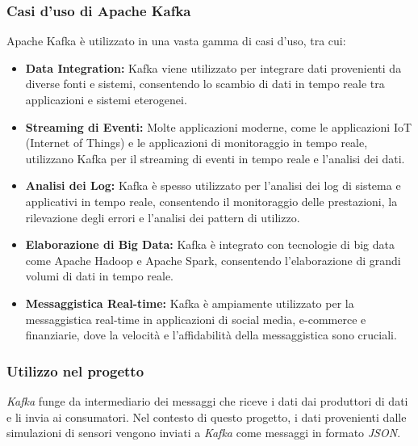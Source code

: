 \subsubsection{Casi d'uso di Apache Kafka}

Apache Kafka è utilizzato in una vasta gamma di casi d'uso, tra cui:

\begin{itemize}
  \item \textbf{Data Integration:} Kafka viene utilizzato per integrare dati provenienti da diverse fonti e sistemi, consentendo lo scambio di dati in tempo reale tra applicazioni e sistemi eterogenei.
  
  \item \textbf{Streaming di Eventi:} Molte applicazioni moderne, come le applicazioni IoT (Internet of Things) e le applicazioni di monitoraggio in tempo reale, utilizzano Kafka per il streaming di eventi in tempo reale e l'analisi dei dati.
  
  \item \textbf{Analisi dei Log:} Kafka è spesso utilizzato per l'analisi dei log di sistema e applicativi in tempo reale, consentendo il monitoraggio delle prestazioni, la rilevazione degli errori e l'analisi dei pattern di utilizzo.
  
  \item \textbf{Elaborazione di Big Data:} Kafka è integrato con tecnologie di big data come Apache Hadoop e Apache Spark, consentendo l'elaborazione di grandi volumi di dati in tempo reale.
  
  \item \textbf{Messaggistica Real-time:} Kafka è ampiamente utilizzato per la messaggistica real-time in applicazioni di social media, e-commerce e finanziarie, dove la velocità e l'affidabilità della messaggistica sono cruciali.
\end{itemize}

\subsubsection{Utilizzo nel progetto}
\textit{Kafka} funge da intermediario dei messaggi che riceve i dati dai produttori di dati e li invia ai consumatori. Nel contesto di questo progetto, i dati provenienti dalle simulazioni di sensori vengono inviati a \textit{Kafka} come messaggi in formato \textit{JSON}.

